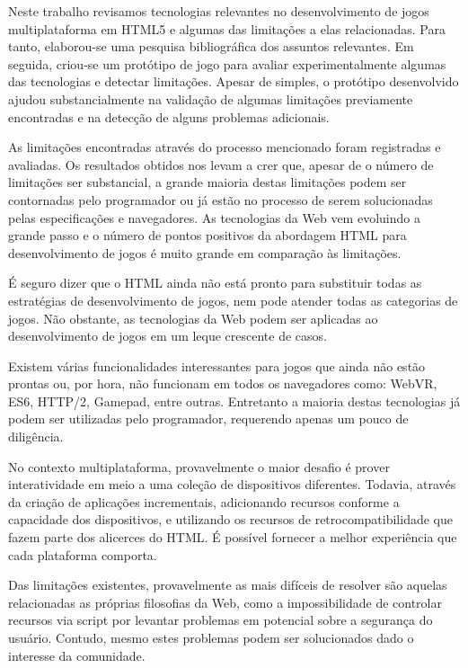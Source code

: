 Neste trabalho revisamos tecnologias relevantes no desenvolvimento
de jogos multiplataforma em HTML5 e algumas das limitações a elas
relacionadas. Para tanto, elaborou-se uma pesquisa bibliográfica
dos assuntos relevantes. Em seguida, criou-se um protótipo de jogo
para avaliar experimentalmente algumas das tecnologias e detectar
limitações. Apesar de simples, o protótipo desenvolvido ajudou
substancialmente na validação de algumas limitações previamente
encontradas e na detecção de alguns problemas adicionais.

As limitações encontradas através do processo mencionado foram
registradas e avaliadas. Os resultados obtidos nos levam a crer que,
apesar de o número de limitações ser substancial, a grande maioria
destas limitações podem ser contornadas pelo programador ou já estão
no processo de serem solucionadas pelas especificações e navegadores.
As tecnologias da Web vem evoluindo a grande passo e o número de pontos
positivos da abordagem HTML para desenvolvimento de jogos é muito
grande em comparação às limitações.

É seguro dizer que o HTML ainda não está pronto para substituir todas
as estratégias de desenvolvimento de jogos, nem pode atender todas as
categorias de jogos. Não obstante, as tecnologias da Web podem ser
aplicadas ao desenvolvimento de jogos em um leque crescente de casos.

Existem várias funcionalidades interessantes para jogos que ainda não
estão prontas ou, por hora, não funcionam em todos os navegadores
como: WebVR, ES6, HTTP/2, Gamepad, entre outras. Entretanto a maioria
destas tecnologias já podem ser utilizadas pelo programador, requerendo
apenas um pouco de diligência.

No contexto multiplataforma, provavelmente o maior desafio é prover
interatividade em meio a uma coleção de dispositivos diferentes.
Todavia, através da criação de aplicações incrementais,
adicionando recursos conforme a capacidade dos dispositivos, e
utilizando os recursos de retrocompatibilidade que fazem parte dos
alicerces do HTML. É possível fornecer a melhor experiência que cada
plataforma comporta.

Das limitações existentes, provavelmente as mais difíceis de resolver
são aquelas relacionadas as próprias filosofias da Web, como a
impossibilidade de controlar recursos via script por levantar problemas
em potencial sobre a segurança do usuário. Contudo, mesmo estes problemas
podem ser solucionados dado o interesse da comunidade.

